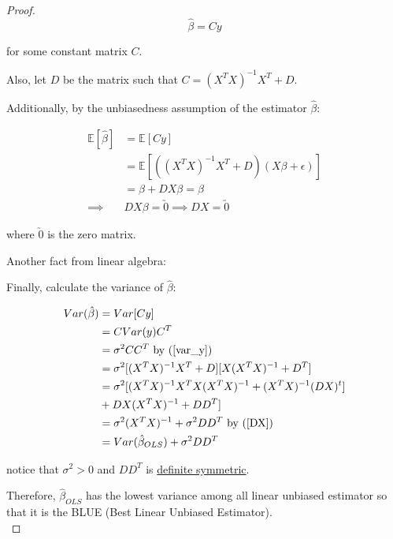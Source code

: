 \documentclass[12pt,a4paper]{article}
\begin{document}
\begin{proof}
\[\hat\beta = Cy \]

for some constant matrix \(C\).

Also, let \(D\) be the matrix such that \(C=(X^TX)^{-1}X^T+D\).

Additionally, by the unbiasedness assumption of the estimator
\(\hat\beta\):

\begin{align}\mathbb{E}[\hat\beta]&=\mathbb{E}[Cy]\\&=\mathbb{E}[((X^TX)^{-1}X^T+D)(X\beta+\epsilon)]\\&=\beta+DX\beta=\beta\\\implies\label{DX} &DX\beta=\utilde{0}\implies DX=\utilde{0}\end{align}

where \(\utilde{0}\) is the zero matrix.

Another fact from linear algebra:

Finally, calculate the variance of \(\hat\beta\):

\begin{align}Var(\hat\beta)&=Var[Cy]\\&=CVar(y)C^T\\&=\sigma^2CC^T \text{ by (\ref{var_y})}\\&=\sigma^2[(X^TX)^{-1}X^T+D][X(X^TX)^{-1}+D^T]\\&=\sigma^2[(X^TX)^{-1}X^TX(X^TX)^{-1}+(X^TX)^{-1}(DX)^t]\\&+DX(X^TX)^{-1}+DD^T]\\&=\sigma^2(X^TX)^{-1}+\sigma^2DD^T\text{ by (\ref{DX})}\\&= Var(\hat\beta_{OLS})+\sigma^2DD^T\end{align}

notice that \(\sigma^2>0\) and \(DD^T\) is
\href{https://en.wikipedia.org/wiki/Definite_symmetric_matrix}{definite
symmetric}.

Therefore, \(\hat\beta_{OLS}\) has the lowest variance among all linear unbiased
estimator so that it is the BLUE (Best Linear Unbiased
Estimator).\\
\end{proof}
\end{document}
